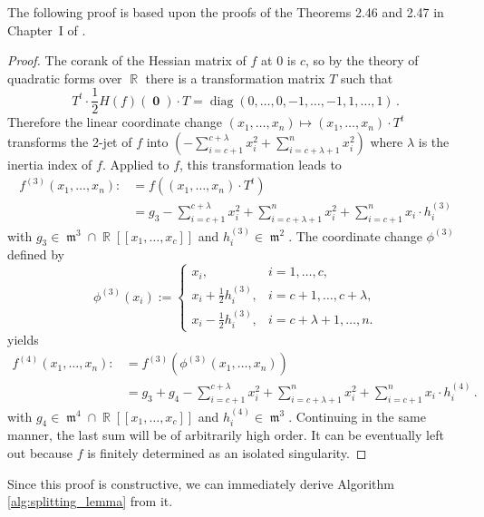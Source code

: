 \documentclass[noend]{amsproc}
\theoremstyle{definition}
\DeclareMathOperator{\m}{\mathfrak{m}}
\DeclareMathOperator{\diag}{diag}
\DeclareMathOperator{\R}{\mathbb{R}}
\DeclareMathOperator{\boldzero}{\mathbf{0}}
\begin{document}
The following proof is based upon the proofs of the Theorems 2.46 and 2.47 in
Chapter~I of \citet{GLS2007}.

\begin{proof}
The corank of the Hessian matrix of $f$ at $0$ is $c$, so by the theory of
quadratic forms over $\R$ there is a transformation matrix $T$ such that
\[
T^t \cdot {\textstyle\frac{1}{2}} H(f)(\boldzero) \cdot T
= \diag(0,\ldots,0,-1,\ldots,-1,1,\ldots,1) \,.
\]
Therefore the linear coordinate change
$(x_1,\ldots,x_n) \mapsto (x_1,\ldots,x_n) \cdot T^t$ transforms the 2-jet of
$f$ into
$\left(-\sum_{i=c+1}^{c+\lambda} x_i^2 +\sum_{i=c+\lambda+1}^n x_i^2\right)$
where $\lambda$ is the inertia index of $f$.
Applied to $f$, this transformation leads to
\begin{align*}
f^{(3)} (x_1,\ldots,x_n)
  :\!&= f((x_1,\ldots,x_n) \cdot T^t) \\
  &= g_3
  -\sum_{i=c+1}^{c+\lambda} x_i^2 +\sum_{i=c+\lambda+1}^n x_i^2
  +\sum_{i=c+1}^n x_i\cdot h_i^{(3)}
\end{align*}
with $g_3 \in \m^3 \cap \R[[x_1,\ldots,x_c]]$ and $h_i^{(3)} \in \m^2$. The
coordinate change $\phi^{(3)}$ defined by
\[
\phi^{(3)}(x_i) :=
\begin{cases}
x_i,                      &i = 1, \ldots, c, \\
x_i+\frac{1}{2}h_i^{(3)}, &i = c+1, \ldots, c+\lambda, \\
x_i-\frac{1}{2}h_i^{(3)}, &i = c+\lambda+1, \ldots, n.
\end{cases}
\]
yields
\begin{align*}
f^{(4)} (x_1,\ldots,x_n)
  :\!&= f^{(3)}(\phi^{(3)}(x_1,\ldots,x_n)) \\
  &= g_3 +g_4
  -\sum_{i=c+1}^{c+\lambda} x_i^2 +\sum_{i=c+\lambda+1}^n x_i^2
  +\sum_{i=c+1}^n x_i\cdot h_i^{(4)} \,.
\end{align*}
with $g_4 \in \m^4 \cap \R[[x_1,\ldots,x_c]]$ and $h_i^{(4)} \in \m^3$.
Continuing in the same manner, the last sum will be of arbitrarily high order.
It can be eventually left out because $f$ is finitely determined as an isolated
singularity.
\end{proof}

Since this proof is constructive, we can immediately derive Algorithm
\ref{alg:splitting_lemma} from it.
\end{document}
